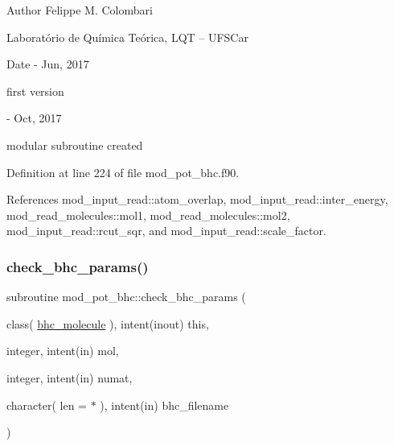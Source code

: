 \begin{DoxyAuthor}{Author}
Felippe M. Colombari
\begin{DoxyItemize}
\item Laboratório de Química Teórica, L\+QT -- U\+F\+S\+Car 
\end{DoxyItemize}
\end{DoxyAuthor}
\begin{DoxyDate}{Date}
-\/ Jun, 2017
\begin{DoxyItemize}
\item first version 
\end{DoxyItemize}

-\/ Oct, 2017
\begin{DoxyItemize}
\item modular subroutine created 
\end{DoxyItemize}
\end{DoxyDate}


Definition at line 224 of file mod\+\_\+pot\+\_\+bhc.\+f90.



References mod\+\_\+input\+\_\+read\+::atom\+\_\+overlap, mod\+\_\+input\+\_\+read\+::inter\+\_\+energy, mod\+\_\+read\+\_\+molecules\+::mol1, mod\+\_\+read\+\_\+molecules\+::mol2, mod\+\_\+input\+\_\+read\+::rcut\+\_\+sqr, and mod\+\_\+input\+\_\+read\+::scale\+\_\+factor.

\mbox{\label{namespacemod__pot__bhc_a4fe10c812421f1de0a51b6fa227fcfd9}} 
\subsubsection{\texorpdfstring{check\+\_\+bhc\+\_\+params()}{check\_bhc\_params()}}
{\footnotesize\ttfamily subroutine mod\+\_\+pot\+\_\+bhc\+::check\+\_\+bhc\+\_\+params (\begin{DoxyParamCaption}\item[{class( \hyperlink{structmod__pot__bhc_1_1bhc__molecule}{bhc\+\_\+molecule} ), intent(inout)}]{this,  }\item[{integer, intent(in)}]{mol,  }\item[{integer, intent(in)}]{numat,  }\item[{character( len = $\ast$ ), intent(in)}]{bhc\+\_\+filename }\end{DoxyParamCaption})}



